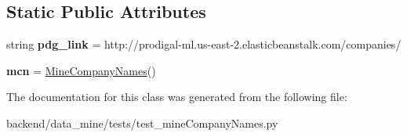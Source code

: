 \subsection*{Static Public Attributes}
\begin{DoxyCompactItemize}
\item 
\mbox{\label{classdata__mine_1_1tests_1_1test__mine_company_names_1_1_mine_company_names_test_case_acbac6b97ebcbd6e04536ba7049e0d236}} 
string {\bfseries pdg\+\_\+link} = \textquotesingle{}http\+://prodigal-\/ml.\+us-\/east-\/2.elasticbeanstalk.\+com/companies/\textquotesingle{}
\item 
\mbox{\label{classdata__mine_1_1tests_1_1test__mine_company_names_1_1_mine_company_names_test_case_aee3a811aa5a0f812b366fc0a908fe439}} 
{\bfseries mcn} = \mbox{\hyperlink{classdata__mine_1_1_mine_company_names_1_1_mine_company_names}{Mine\+Company\+Names}}()
\end{DoxyCompactItemize}


The documentation for this class was generated from the following file\+:\begin{DoxyCompactItemize}
\item 
backend/data\+\_\+mine/tests/test\+\_\+mine\+Company\+Names.\+py\end{DoxyCompactItemize}

